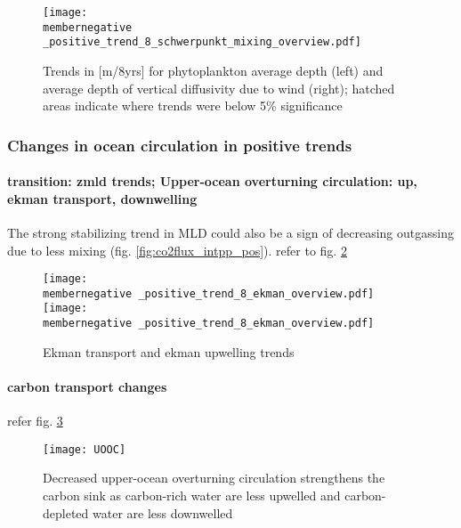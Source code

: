 \documentclass[12pt]{article}
\newcommand{\membernegative}{m143_1995_2002}
\begin{document}
\begin{figure}[h!]
	\centering
	\texttt{[image: \\membernegative \_positive\_trend\_8\_schwerpunkt\_mixing\_overview.pdf]}
	\caption{Trends in [m/8yrs] for phytoplankton average depth (left) and average depth of vertical diffusivity due to wind (right); hatched areas indicate where trends were below 5\% significance}
	\label{fig:wind_mixing_pos}
\end{figure}




\clearpage

\subsubsection{Changes in ocean circulation in positive trends}

\paragraph{transition: zmld trends; Upper-ocean overturning circulation: up, ekman transport, downwelling} 
The strong  stabilizing trend in MLD could also be a sign of decreasing outgassing due to less mixing (fig. \ref{fig:co2flux_intpp_pos}). refer to fig. \ref{fig:ekman_pos}

\begin{figure}[h!]
	\centering
	\texttt{[image: \\membernegative \_positive\_trend\_8\_ekman\_overview.pdf]}
	\texttt{[image: \\membernegative \_positive\_trend\_8\_ekman\_overview.pdf]}
	\caption{Ekman transport and ekman upwelling trends}
	\label{fig:ekman_pos}
\end{figure}


\paragraph{carbon transport changes}
refer fig. \ref{fig:UOOC_pos}


\begin{figure}[h!]
	\centering
	\texttt{[image: UOOC]}
	\vspace{-5mm}
	\caption{Decreased upper-ocean overturning circulation strengthens the carbon sink as carbon-rich water are less upwelled and carbon-depleted water are less downwelled}%
	\label{fig:UOOC_pos}
\end{figure}
\end{document}
